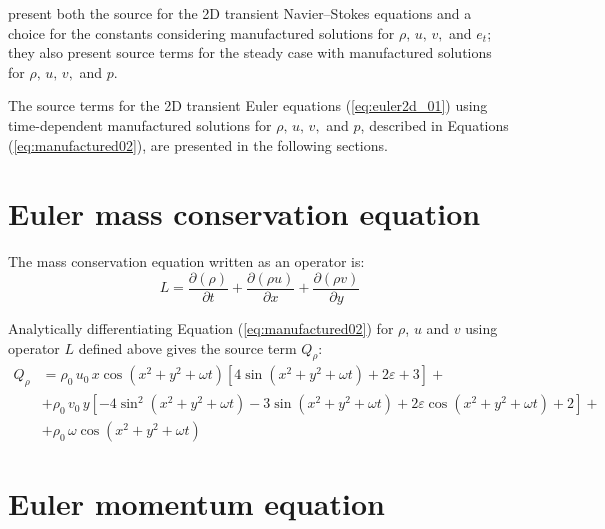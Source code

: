 \documentclass[10pt]{article}
\newcommand{\Diff}[2] {\dfrac{\partial( #1)}{\partial #2}}
\begin{document}
\citet{Salari_Knupp_2000} present both the source for the 2D transient Navier--Stokes equations and a choice for the constants considering manufactured solutions for  $\rho,\,u,\,v,$ and $e_t$; they also present source terms for the steady case with manufactured solutions for  $\rho,\,u,\,v,$ and $p$. 


The source terms for the 2D transient Euler equations (\ref{eq:euler2d_01}) using time-dependent manufactured solutions  for $\rho,\,u,\,v,$ and $p$, described in Equations (\ref{eq:manufactured02}), are presented in the following sections.


\section{Euler mass conservation equation}

The mass conservation equation written as an operator is:
\begin{equation}
 \label{eq:euler2d_11}
L= \Diff{\rho}{t} + \Diff{\rho u}{x}+\Diff{\rho v}{y} 
\end{equation}

Analytically differentiating Equation (\ref{eq:manufactured02}) for $\rho$, $u$ and $v$ using operator $L$ defined above gives  the source term $Q_{\rho}$:
\begin{equation}
\begin{split}
Q_\rho
&= \rho_0\, u_0\, x \cos(x^2+y^2+\omega t)[4 \sin(x^2+y^2+\omega t)+2 \varepsilon+3] +\\
&+ \rho_0\, v_0\, y[-4 \sin^2(x^2+y^2+\omega t)-3 \sin(x^2+y^2+\omega t)+2 \varepsilon \cos(x^2+y^2+\omega t)+2] +\\
&+\rho_0\, \omega \cos(x^2+y^2+\omega t)
\end{split}
\end{equation}
\section{Euler momentum equation}
\end{document}
